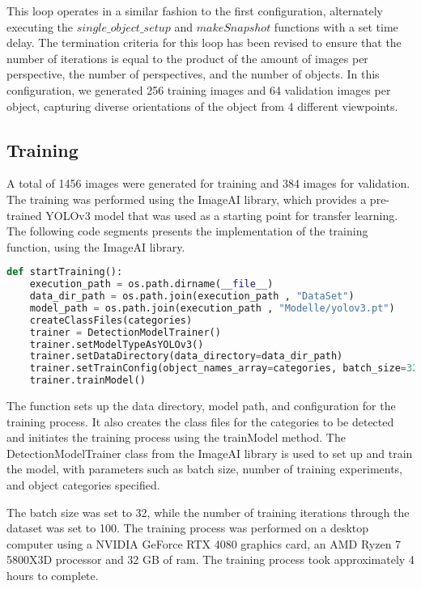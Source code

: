 This loop operates in a similar fashion to the first configuration, alternately executing the \(single\_object\_setup\) and \(makeSnapshot\) functions with a set time delay. The termination criteria for this loop has been revised to ensure that the number of iterations is equal to the product of the amount of images per perspective, the number of perspectives, and the number of objects. In this configuration, we generated 256 training images and 64 validation images per object, capturing diverse orientations of the object from 4 different viewpoints.

\subsection{Training }

A total of 1456 images were generated for training and 384 images for validation. The training was performed using the ImageAI library, which provides a pre-trained YOLOv3 model that was used as a starting point for transfer learning. The following code segments presents the implementation of the training function, using the ImageAI library. 

\begin{lstlisting}[language=python]
def startTraining():
    execution_path = os.path.dirname(__file__)
    data_dir_path = os.path.join(execution_path , "DataSet")
    model_path = os.path.join(execution_path , "Modelle/yolov3.pt")
    createClassFiles(categories) 
    trainer = DetectionModelTrainer()
    trainer.setModelTypeAsYOLOv3()
    trainer.setDataDirectory(data_directory=data_dir_path)
    trainer.setTrainConfig(object_names_array=categories, batch_size=32, num_experiments=100, train_from_pretrained_model=model_path)
    trainer.trainModel()
\end{lstlisting}
The function sets up the data directory, model path, and configuration for the training process. It also creates the class files for the categories to be detected and initiates the training process using the trainModel method. The DetectionModelTrainer class from the ImageAI library is used to set up and train the model, with parameters such as batch size, number of training experiments, and object categories specified. 

The batch size was set to 32, while the number of training iterations through the dataset was set to 100. The training process was performed on a desktop computer using a NVIDIA GeForce RTX 4080 graphics card, an AMD Ryzen 7 5800X3D processor and 32 GB of ram. The training process took approximately 4 hours to complete.


